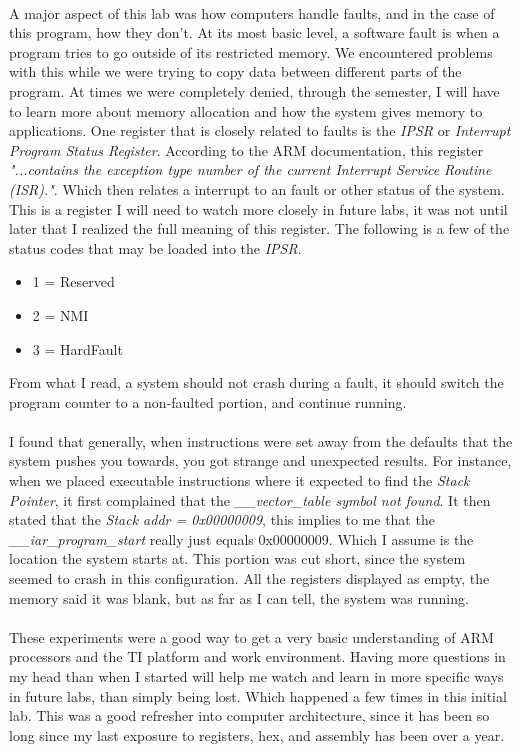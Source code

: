 \documentclass[12pt,a4paper,notitlepage]{report}
\begin{document}
\begin{normalsize}
	\paragraph*{} 
	A major aspect of this lab was how computers handle faults, and in the case of this program, how they don't. At its most basic level, a software fault is when a program tries to go outside of its restricted memory. We encountered problems with this while we were trying to copy data between different parts of the program. At times we were completely denied, through the semester, I will have to learn more about memory allocation and how the system gives memory to applications. One register that is closely related to faults is the \emph{IPSR} or \emph{Interrupt Program Status Register}. According to the ARM documentation, this register \emph{"...contains the exception type number of the current Interrupt Service Routine (ISR)."}. Which then relates a interrupt to an fault or other status of the system. This is a register I will need to watch more closely in future labs, it was not until later that I realized the full meaning of this register. The following is a few of the status codes that may be loaded into the \emph{IPSR}.
\pagebreak 
\begin{itemize}
  \item 1 = Reserved
  \item 2 = NMI
  \item 3 = HardFault
\end{itemize}
From what I read, a system should not crash during a fault, it should switch the program counter to a non-faulted portion, and continue running. 

\paragraph*{}
I found that generally, when instructions were set away from the defaults that the system pushes you towards, you got strange and unexpected results. For instance, when we placed executable instructions where it expected to find the \emph{Stack Pointer}, it first complained that the \emph{\_\_vector\_table symbol not found}. It then stated that the \emph{Stack addr = 0x00000009}, this implies to me that the \emph{\_\_iar\_program\_start} really just equals 0x00000009. Which I assume is the location the system starts at. This portion was cut short, since the system seemed to crash in this configuration. All the registers displayed as empty, the memory said it was blank, but as far as I can tell, the system was running. 
\pagebreak
\paragraph*{}
These experiments were a good way to get a very basic understanding of ARM processors and the TI platform and work environment. Having more questions in my head than when I started will help me watch and learn in more specific ways in future labs, than simply being lost. Which happened a few times in this initial lab. This was a good refresher into computer architecture, since it has been so long since my last exposure to registers, hex, and assembly has been over a year. 

\end{normalsize}
\end{document}
